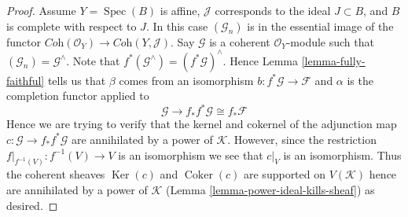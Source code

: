 \documentclass[10pt,a4paper]{amsart}
\theoremstyle{plain}
\theoremstyle{definition}
\theoremstyle{remark}
\numberwithin{equation}{subsection}
\def\Spec{\mathop{\mathrm{Spec}}}
\def\Ker{\mathop{\mathrm{Ker}}}
\def\Coker{\mathop{\mathrm{Coker}}}
\begin{document}
\begin{proof}
\medskip\noindent
Assume $Y = \Spec(B)$ is affine, $\mathcal{J}$ corresponds to the ideal
$J \subset B$, and $B$ is complete with respect to $J$.
In this case $(\mathcal{G}_n)$ is in the essential image of the functor
$\textit{Coh}(\mathcal{O}_Y) \to \textit{Coh}(Y, \mathcal{J})$.
Say $\mathcal{G}$ is a coherent $\mathcal{O}_Y$-module such that
$(\mathcal{G}_n) = \mathcal{G}^\wedge$. Note that
$f^*(\mathcal{G}^\wedge) = (f^*\mathcal{G})^\wedge$. Hence
Lemma \ref{lemma-fully-faithful}
tells us that $\beta$ comes from an isomorphism
$b : f^*\mathcal{G} \to \mathcal{F}$
and $\alpha$ is the completion functor applied to
$$
\mathcal{G} \to f_*f^*\mathcal{G} \cong f_*\mathcal{F}
$$
Hence we are trying to verify that the kernel and cokernel of the
adjunction map $c : \mathcal{G} \to f_*f^*\mathcal{G}$ are annihilated by
a power of $\mathcal{K}$. However, since the restriction
$f|_{f^{-1}(V)} : f^{-1}(V) \to V$ is an isomorphism
we see that $c|_V$ is an isomorphism. Thus the coherent sheaves
$\Ker(c)$ and $\Coker(c)$ are supported on $V(\mathcal{K})$
hence are annihilated by a power of $\mathcal{K}$
(Lemma \ref{lemma-power-ideal-kills-sheaf}) as desired.
\end{proof}
\end{document}
